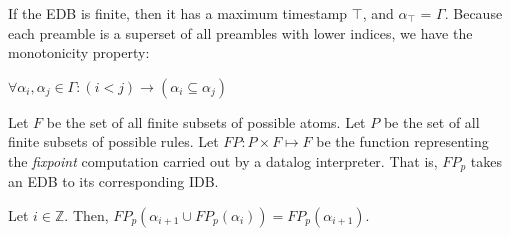 If the EDB is finite, then it has a maximum timestamp $\top$,  and
$\alpha_{\top}$ = $\Gamma$.  
Because each preamble is a superset of all preambles with lower indices, we
have the monotonicity property:

$\forall \alpha_{i}, \alpha_{j} \in \Gamma : (i < j) \to (\alpha_{i} \subseteq \alpha_{j})$


\begin{definition}
%
Let $F$ be the set of all finite subsets of possible atoms.  Let $P$ be the set
of all finite subsets of possible rules.  Let $FP : P \times F \mapsto F$ be
the function representing the \emph{fixpoint} computation carried out by a
datalog interpreter.  That is, $FP_p$ takes an EDB to its corresponding IDB.
%
\end{definition}


\begin{lemma}
\label{lem:costmodel}
%
Let $i \in \mathbb{Z}$.  Then, $FP_p(\alpha_{i+1} \cup FP_p(\alpha_i)) =
FP_p(\alpha_{i+1})$.
%
\end{lemma}


